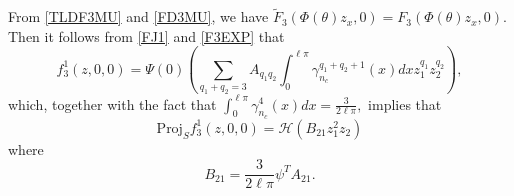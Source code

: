 \documentclass[11pt]{article}
\theoremstyle{definition}
\theoremstyle{remark}
\numberwithin{equation}{section}
\begin{document}
From  \eqref{TLDF3MU} and \eqref{FD3MU},  we have
$\widetilde{F}_3(\Phi(\theta)z_x,0)= F_3(\Phi(\theta)
z_x,0)$.  Then it follows from \eqref{FJ1} and \eqref{F3EXP}  that
$$
f_3^1(z, 0, 0)=\Psi (0)\left(
\sum\limits_{q_1+q_2=3}A_{q_1q_2}\int_0^{\ell\pi}\gamma_{n_c}^{q_1+q_2+1}(x)dxz_1^{q_1}z_2^{q_2}
\right),
$$
which, together with
the fact that
$ \int_0^{\ell\pi}\gamma_{n_c}^4(x)  dx=
\frac{3}{2\ell\pi},
  $
implies that
\begin{equation}\label{PF31}
\mbox{Proj}_{S}f_3^1(z,0,0)=
\mathcal{H} \left(B_{21}z_1^2z_2\right)
\end{equation}
where
\begin{equation}
\label{B21}
B_{21}=\frac{3}{2\ell\pi}  \psi ^{T}A_{21} .
\end{equation}
\vspace{0.4cm}
\end{document}
